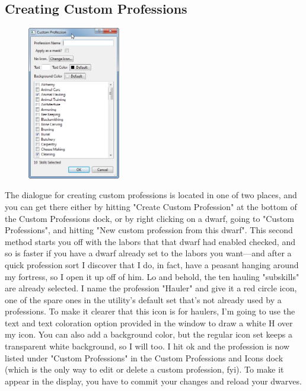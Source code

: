 \documentclass[]{article}
\begin{document}
\subsection{Creating Custom Professions}
\label{sec:Creating Custom Professions}
\begin{figure}
\vspace{-20pt}
  \begin{center}
    \includegraphics[width=0.36\textwidth]{Sec3Fig10}
  \end{center}
\vspace{-15pt}
\end{figure}
The dialogue for creating custom professions is located in one of two places, and you can get there
either by hitting "Create Custom Profession" at the bottom of the Custom Professions dock, or by right
clicking on a dwarf, going to "Custom Professions", and hitting "New custom profession from this dwarf".
This second method starts you off with the labors that that dwarf had enabled checked, and so is faster
if you have a dwarf already set to the labors you want---and after a quick profession sort I discover
that I do, in fact, have a peasant hanging around my fortress, so I open it up off of him. Lo and behold,
the ten hauling "subskills" are already selected. I name the profession "Hauler" and give it a red circle
icon, one of the spare ones in the utility's default set that's not already used by a professions. To
make it clearer that this icon is for haulers, I'm going to use the text and text coloration option
provided in the window to draw a white H over my icon. You can also add a background color, but the
regular icon set keeps a transparent white background, so I will too. I hit ok and the profession is now
listed under "Custom Professions" in the Custom Professions and Icons dock (which is the only way to edit
or delete a custom profession, fyi). To make it appear in the display, you have to commit your changes
and reload your dwarves.
\end{document}
